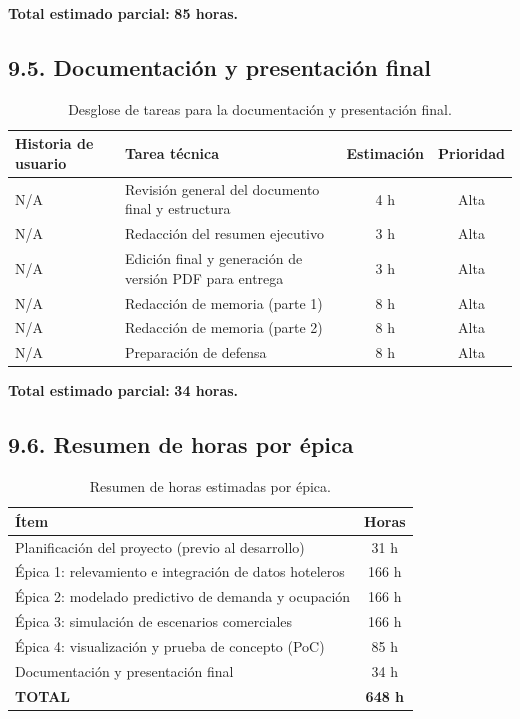 \documentclass[
11pt, %
]{charter}
\begin{document}
\noindent
\textbf{Total estimado parcial:} \textbf{85 horas.}

\subsection*{9.5. Documentación y presentación final}
 
\begin{table}[H]
\centering
\begin{tabularx}{\linewidth}{@{}|X|X|c|c|@{}}
\hline
\rowcolor[HTML]{C0C0C0}
Historia de usuario & Tarea técnica & Estimación & Prioridad \\ \hline
N/A & Revisión general del documento final y estructura & 4 h & Alta \\ \hline
N/A & Redacción del resumen ejecutivo & 3 h & Alta \\ \hline
N/A & Edición final y generación de versión PDF para entrega & 3 h & Alta \\ \hline
N/A & Redacción de memoria (parte 1) & 8 h & Alta \\ \hline
N/A & Redacción de memoria (parte 2) & 8 h & Alta \\ \hline
N/A & Preparación de defensa & 8 h & Alta \\ \hline
\end{tabularx}
\caption{Desglose de tareas para la documentación y presentación final.}
\end{table}
 
\noindent
\textbf{Total estimado parcial:} \textbf{34 horas.}

\subsection*{9.6. Resumen de horas por épica}
 
\begin{table}[H]
\centering
\begin{tabularx}{0.6\linewidth}{@{}|X|c|@{}}
\hline
\rowcolor[HTML]{C0C0C0}
Ítem & Horas \\ \hline
Planificación del proyecto (previo al desarrollo) & 31 h \\ \hline
Épica 1: relevamiento e integración de datos hoteleros & 166 h \\ \hline
Épica 2: modelado predictivo de demanda y ocupación & 166 h \\ \hline
Épica 3: simulación de escenarios comerciales & 166 h \\ \hline
Épica 4: visualización y prueba de concepto (PoC) & 85 h \\ \hline
Documentación y presentación final & 34 h \\ \hline
\textbf{TOTAL} & \textbf{648 h} \\ \hline
\end{tabularx}
\caption{Resumen de horas estimadas por épica.}
\end{table}
\end{document}

